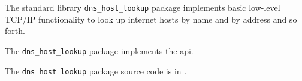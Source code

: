 
The standard library {\tt dns\_host\_lookup} package implements basic low-level {\sc TCP/IP} 
functionality to look up internet hosts by name and by address and so forth.

The {\tt dns\_host\_lookup} package implements the  api.

The {\tt dns\_host\_lookup} package source code is in .

